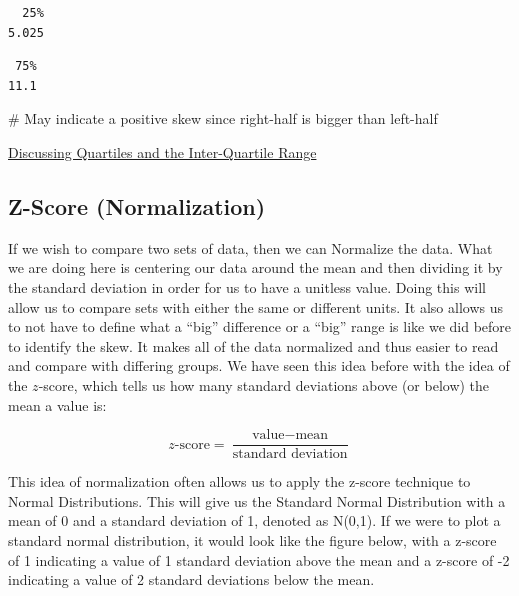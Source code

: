 \documentclass[
  letterpaper,
  DIV=11,
  numbers=noendperiod]{scrreprt}
\newenvironment{Shaded}{\begin{snugshade}}{\end{snugshade}}
\newcommand{\CommentTok}[1]{\textcolor[rgb]{0.37,0.37,0.37}{#1}}
\newcommand{\DecValTok}[1]{\textcolor[rgb]{0.68,0.00,0.00}{#1}}
\newcommand{\FunctionTok}[1]{\textcolor[rgb]{0.28,0.35,0.67}{#1}}
\newcommand{\NormalTok}[1]{\textcolor[rgb]{0.00,0.23,0.31}{#1}}
\newcommand{\SpecialCharTok}[1]{\textcolor[rgb]{0.37,0.37,0.37}{#1}}
\begin{document}
\begin{verbatim}
  25% 
5.025 
\end{verbatim}

\begin{Shaded}
\end{Shaded}

\begin{verbatim}
 75% 
11.1 
\end{verbatim}

\begin{Shaded}
\begin{Highlighting}[]
\CommentTok{\# May indicate a positive skew since right{-}half is bigger than left{-}half}
\end{Highlighting}
\end{Shaded}

\begin{watch}{}{}
    \href{https://youtu.be/5GPioBqp2Og}{Discussing Quartiles and the Inter-Quartile Range}
\end{watch}

\subsection{Z-Score (Normalization)}\label{z-score-normalization}

If we wish to compare two sets of data, then we can Normalize the data.
What we are doing here is centering our data around the mean and then
dividing it by the standard deviation in order for us to have a unitless
value. Doing this will allow us to compare sets with either the same or
different units. It also allows us to not have to define what a ``big''
difference or a ``big'' range is like we did before to identify the
skew. It makes all of the data normalized and thus easier to read and
compare with differing groups. We have seen this idea before with the
idea of the \(z\)-score, which tells us how many standard deviations
above (or below) the mean a value is:

\[ z\text{-score} = \frac{\text{value} - \text{mean}}{\text{standard deviation}}\]

This idea of normalization often allows us to apply the z-score
technique to Normal Distributions. This will give us the Standard Normal
Distribution with a mean of 0 and a standard deviation of 1, denoted as
N(0,1). If we were to plot a standard normal distribution, it would look
like the figure below, with a z-score of 1 indicating a value of 1
standard deviation above the mean and a z-score of -2 indicating a value
of 2 standard deviations below the mean.
\end{document}

